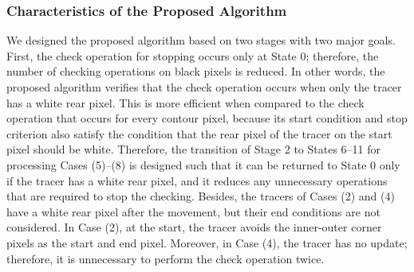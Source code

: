 \documentclass[sensors,article,accept,moreauthors,pdftex,10pt,a4paper]{mdpi}
\begin{document}
\subsubsection{Characteristics of the Proposed Algorithm}


We designed the proposed algorithm based on two stages with two major goals. First, the check operation for stopping occurs only at State 0; therefore, the number of checking operations on black pixels is reduced. In other words, the proposed algorithm verifies that the check operation occurs when only the tracer has a white rear pixel. This is more efficient when compared to the check operation that occurs for every contour pixel, because its start condition and stop criterion also satisfy the condition that the rear pixel of the tracer on the start pixel should be white. Therefore, the transition of \linebreak Stage 2 to States 6--11 for processing Cases (5)--(8) is designed such that it can be returned to State 0 only if the tracer has a white rear pixel, and it reduces any unnecessary operations that are required to stop the checking. Besides, the tracers of Cases (2) and (4) have a white rear pixel after the movement, but their end conditions are not considered. In Case (2), at the start, the tracer avoids the inner-outer corner pixels as the start and end pixel. Moreover, in Case (4), the tracer has no update; therefore, it is unnecessary to perform the check operation twice. 
\end{document}
